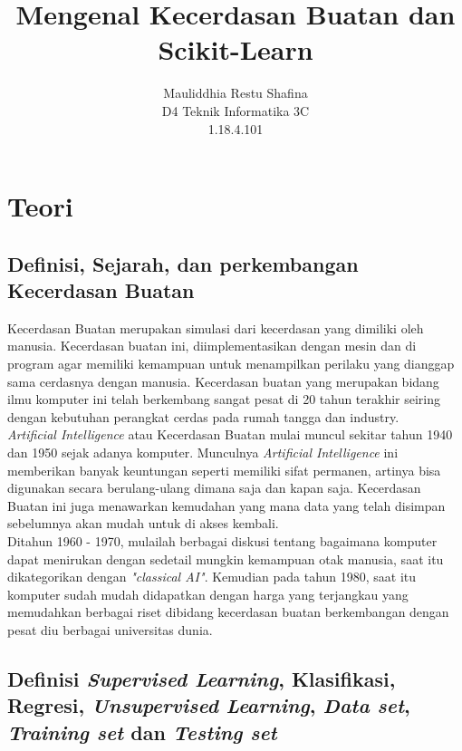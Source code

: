 \documentclass{article}
\title{Mengenal Kecerdasan Buatan dan Scikit-Learn}
\author{Mauliddhia Restu Shafina\\D4 Teknik Informatika 3C\\1.18.4.101}
\begin{document}
\maketitle

\section{Teori}

\subsection{Definisi, Sejarah, dan perkembangan Kecerdasan Buatan}
Kecerdasan Buatan merupakan simulasi dari kecerdasan yang dimiliki oleh manusia. Kecerdasan buatan ini, diimplementasikan dengan mesin dan di program agar memiliki kemampuan untuk menampilkan perilaku yang dianggap sama cerdasnya dengan manusia. Kecerdasan buatan yang merupakan bidang ilmu komputer ini telah berkembang sangat pesat di 20 tahun terakhir seiring dengan kebutuhan perangkat cerdas pada rumah tangga dan industry.\\

\textit{Artificial Intelligence} atau Kecerdasan Buatan mulai muncul sekitar tahun 1940 dan 1950 sejak adanya komputer. Munculnya \textit{Artificial Intelligence} ini memberikan banyak keuntungan seperti memiliki sifat permanen, artinya bisa digunakan secara berulang-ulang dimana saja dan kapan saja. Kecerdasan Buatan ini juga menawarkan kemudahan yang mana data yang telah disimpan sebelumnya akan mudah untuk di akses kembali. \\

Ditahun 1960 - 1970, mulailah berbagai diskusi tentang bagaimana komputer dapat menirukan dengan sedetail mungkin kemampuan otak manusia, saat itu dikategorikan dengan \textit{"classical AI"}. Kemudian pada tahun 1980, saat itu komputer sudah mudah didapatkan dengan harga yang terjangkau yang memudahkan berbagai riset dibidang kecerdasan buatan berkembangan dengan pesat diu berbagai universitas dunia. \\

\subsection{Definisi \textit{Supervised Learning}, Klasifikasi, Regresi, \textit{Unsupervised Learning}, \textit{Data set}, \textit{Training set} dan \textit{Testing set}}
\end{document}
